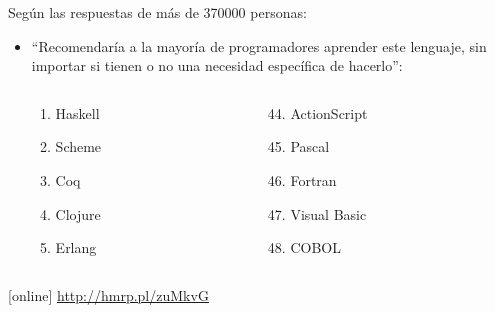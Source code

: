 \documentclass[spanish]{beamer}
\begin{document}
\begin{frame}
  Según las respuestas de más de 370000 personas:
  \begin{itemize}
  \item
    ``Recomendaría a la mayoría de programadores aprender este
    lenguaje, sin importar si tienen o no una necesidad específica de
    hacerlo'':
    \begin{columns}[T]
      \begin{column}{3cm}
        \begin{enumerate}
        \item Haskell
        \item Scheme
        \item Coq
        \item Clojure
        \item Erlang
        \end{enumerate}
      \end{column}
      \begin{column}{3cm}
        \begin{enumerate}
        \setcounter{enumi}{43}
        \item ActionScript
        \item Pascal
        \item Fortran
        \item Visual Basic
        \item COBOL
        \end{enumerate}
      \end{column}
    \end{columns}
  \end{itemize}
  \begin{thebibliography}{}
  [online]
    \newblock \url{http://hmrp.pl/zuMkvG}
  \end{thebibliography}
\end{frame}

\end{document}
